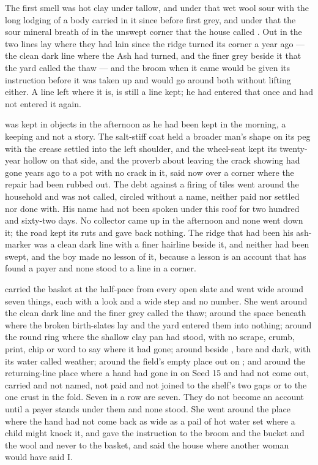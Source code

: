 The first smell was hot clay under tallow, and under that wet wool sour with the long lodging of a body carried in it since before first grey, and under that the sour mineral breath of  in the unswept corner that the house called . Out in  the two lines lay where they had lain since the ridge turned its corner a year ago --- the clean dark line where the Ash had turned, and the finer grey beside it that the yard called the thaw --- and the broom when it came would be given its instruction before it was taken up and would go around both without lifting either. A line left where it is, is still a line kept; he had entered that once and had not entered it again.

\scenebreak

 was kept in objects in the afternoon as he had been kept in the morning, a keeping and not a story. The salt-stiff coat held a broader man's shape on its peg with the crease settled into the left shoulder, and the wheel-seat kept its twenty-year hollow on that side, and the proverb about leaving the crack showing had gone years ago to a pot with no crack in it, said now over a corner where the repair had been rubbed out. The debt against a firing of tiles went around the household and was not called, circled without a name, neither paid nor settled nor done with. His name had not been spoken under this roof for two hundred and sixty-two days. No collector came up  in the afternoon and none went down it; the road kept its ruts and gave back nothing. The ridge that had been his ash-marker was a clean dark line with a finer hairline beside it, and neither had been swept, and the boy made no lesson of it, because a lesson is an account that has found a payer and none stood to a line in a corner.

 carried the basket at the half-pace from every open slate and went wide around seven things, each with a look and a wide step and no number. She went around the clean dark line and the finer grey called the thaw; around the space beneath  where the broken birth-slates lay and the yard entered them into nothing; around the round ring where the shallow clay pan had stood, with no scrape, crumb, print, chip or word to say where it had gone; around  beside , bare and dark, with its water called weather; around the field's empty place out on ; and around the returning-line place where a hand had gone in on Seed 15 and had not come out, carried and not named, not paid and not joined to the shelf's two gaps or to the one crust in the fold. Seven in a row are seven. They do not become an account until a payer stands under them and none stood. She went around the place where the hand had not come back as wide as a pail of hot water set where a child might knock it, and gave the instruction to the broom and the bucket and the wool and never to the basket, and said the house where another woman would have said I.

